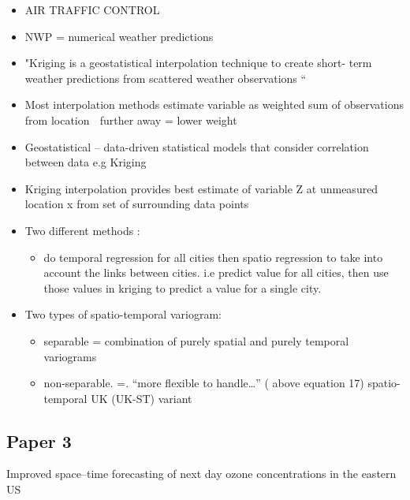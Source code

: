 \begin{itemize}


\item{}AIR TRAFFIC CONTROL
\item{}NWP = numerical weather predictions
\item{}"Kriging is a geostatistical interpolation technique to create short- term weather predictions from scattered weather observations “
\item{}Most interpolation methods estimate variable as weighted sum of observations from location  further away = lower weight
\item{}Geostatistical – data-driven statistical models that consider correlation between data e.g Kriging
\item{}Kriging interpolation provides best estimate of variable Z at unmeasured location x from set of surrounding data points


\item{}Two different methods : 
\begin{itemize}
    


\item{}do temporal regression for all cities then spatio regression to take into account the links between cities. i.e predict value for all cities, then use those values in kriging to predict a value for a single city.



\end{itemize}


\item{}Two types of spatio-temporal variogram:

\begin{itemize}


 
\item{}separable = combination of purely spatial and purely temporal variograms 
\item{}non-separable. =. “more flexible to handle…” ( above equation 17)
spatio-temporal UK (UK-ST) variant 

\end{itemize}
\end{itemize}

\subsection{Paper 3}
Improved space–time forecasting of next day ozone concentrations in the eastern US 

